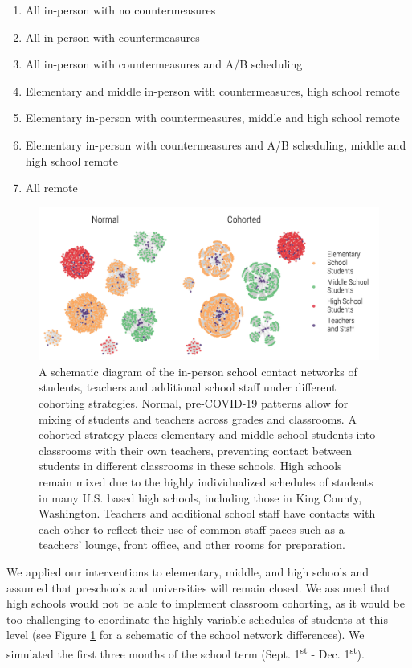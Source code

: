 \documentclass[9pt,twocolumn,twoside,lineno]{pnas-new}
\begin{document}
{\begin{enumerate}
    \item All in-person with no countermeasures
    \item All in-person with countermeasures
    \item All in-person with countermeasures and A/B scheduling
    \item Elementary and middle in-person with countermeasures, high school remote
    \item Elementary in-person with countermeasures, middle and high school remote
    \item Elementary in-person with countermeasures and A/B scheduling, middle and high school remote
    \item All remote
\end{enumerate}

\begin{figure}[tbhp]
    \centering
    \includegraphics[width=\linewidth]{school_cohorting_1.pdf}
    \caption{A schematic diagram of the in-person school contact networks of students, teachers and additional school staff under different cohorting strategies. Normal, pre-COVID-19 patterns allow for mixing of students and teachers across grades and classrooms. A cohorted strategy places elementary and middle school students into classrooms with their own teachers, preventing contact between students in different classrooms in these schools. High schools remain mixed due to the highly individualized schedules of students in many U.S. based high schools, including those in King County, Washington. Teachers and additional school staff have contacts with each other to reflect their use of common staff paces such as a teachers' lounge, front office, and other rooms for preparation.}
    \label{fig:school_cohorting}
\end{figure}

We applied our interventions to elementary, middle, and high schools and assumed that preschools and universities will remain closed. We assumed that high schools would not be able to implement classroom cohorting, as it would be too challenging to coordinate the highly variable schedules of students at this level (see Figure \ref{fig:school_cohorting} for a schematic of the school network differences). We simulated the first three months of the school term (Sept. 1\textsuperscript{st} - Dec. 1\textsuperscript{st}).

}
\end{document}
